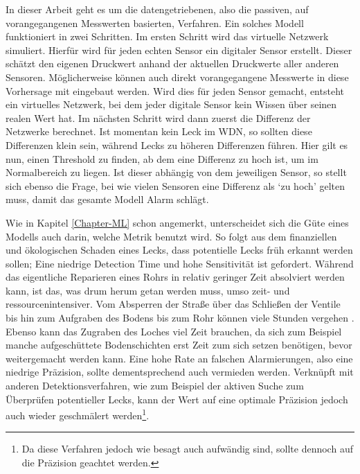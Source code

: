 In dieser Arbeit geht es um die datengetriebenen, also die passiven, auf vorangegangenen Messwerten
 basierten, Verfahren. Ein solches Modell funktioniert in zwei Schritten. Im ersten Schritt wird das
 virtuelle Netzwerk simuliert. Hierfür wird für jeden echten Sensor ein digitaler Sensor erstellt. Dieser
 schätzt den eigenen Druckwert anhand der aktuellen Druckwerte aller anderen Sensoren. Möglicherweise können
 auch direkt vorangegangene Messwerte in diese Vorhersage mit eingebaut werden. Wird dies für jeden Sensor
 gemacht, entsteht ein virtuelles Netzwerk, bei dem jeder digitale Sensor kein Wissen über seinen realen Wert
 hat. Im nächsten Schritt wird dann zuerst die Differenz der Netzwerke berechnet. Ist momentan kein Leck im
 WDN, so sollten diese Differenzen klein sein, während Lecks zu höheren Differenzen führen. Hier gilt es nun,
 einen Threshold zu finden, ab dem eine Differenz zu hoch ist, um im Normalbereich zu liegen. Ist dieser
 abhängig von dem jeweiligen Sensor, so stellt sich ebenso die Frage, bei wie vielen Sensoren eine Differenz
 als ‘zu hoch’ gelten muss, damit das gesamte Modell Alarm schlägt.

Wie in Kapitel \ref{Chapter-ML} schon angemerkt, unterscheidet sich die Güte eines Modells auch darin, welche Metrik
 benutzt wird. So folgt aus dem finanziellen und ökologischen Schaden eines Lecks, dass potentielle Lecks
 früh erkannt werden sollen; Eine niedrige Detection Time und hohe Sensitivität ist gefordert.
 Während das eigentliche Reparieren eines Rohrs in relativ geringer Zeit absolviert werden kann, ist das, was
 drum herum getan werden muss, umso zeit- und ressourcenintensiver. Vom Absperren der Straße über das Schließen
 der Ventile bis hin zum Aufgraben des Bodens bis zum Rohr können viele Stunden vergehen \cite{breakTime}. Ebenso
 kann das Zugraben des Loches viel Zeit brauchen, da sich zum Beispiel manche aufgeschüttete Bodenschichten erst
 Zeit zum sich setzen benötigen, bevor weitergemacht werden kann. Eine hohe Rate an falschen Alarmierungen, also
 eine niedrige Präzision, sollte dementsprechend auch vermieden werden. Verknüpft mit anderen Detektionsverfahren,
 wie zum Beispiel der aktiven Suche zum Überprüfen potentieller Lecks, kann der Wert auf eine optimale Präzision
 jedoch auch wieder geschmälert werden\footnote{Da diese Verfahren jedoch wie besagt auch aufwändig sind, sollte
 dennoch auf die Präzision geachtet werden.}.
